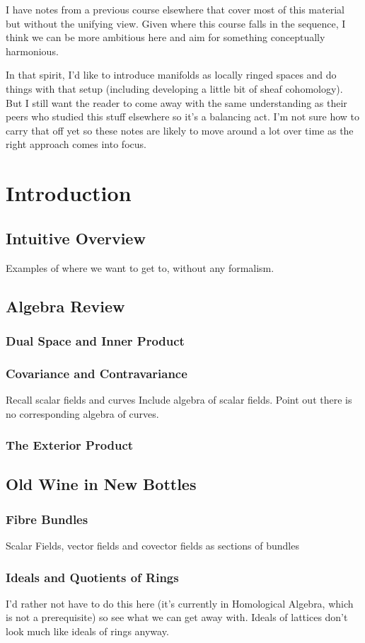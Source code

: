 \documentclass[oneside,english]{amsbook}
\numberwithin{section}{chapter}
\theoremstyle{plain}
\theoremstyle{definition}
\begin{document}
	I have notes from a previous course elsewhere that cover most of this material but without the unifying view. Given where this course falls in the sequence, I think we can be more ambitious here and aim for something conceptually harmonious. 
	
	In that spirit, I'd like to introduce manifolds as locally ringed spaces and do things with that setup (including developing a little bit of sheaf cohomology). But I still want the reader to come away with the same understanding as their peers who studied this stuff elsewhere so it's a balancing act. I'm not sure how to carry that off yet so these notes are likely to move around a lot over time as the right approach comes into focus. 

	\chapter{Introduction}
		\section{Intuitive Overview}
			Examples of where we want to get to, without any formalism.
		\section{Algebra Review}
			\subsection{Dual Space and Inner Product}
			\subsection{Covariance and Contravariance}
			Recall scalar fields and curves
			Include algebra of scalar fields. Point out there is no corresponding algebra of curves. 
			\subsection{The Exterior Product}
		\section{Old Wine in New Bottles}
			\subsection{Fibre Bundles}
			Scalar Fields, vector fields and covector fields as sections of bundles
			\subsection{Ideals and Quotients of Rings}
			I'd rather not have to do this here (it's currently in Homological Algebra, which is not a prerequisite) so see what we can get away with. Ideals of lattices don't look much like ideals of rings anyway.
\end{document}
